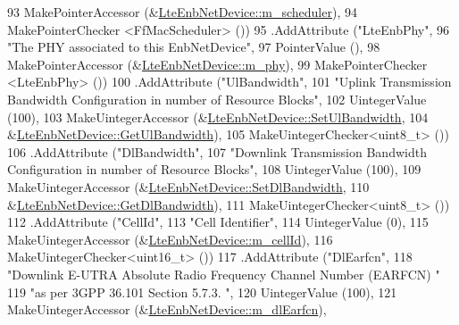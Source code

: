 \begin{DoxyCode}
93                    MakePointerAccessor (&\hyperlink{classns3_1_1LteEnbNetDevice_a5b9b286d0e44d109361ac449beec9833}{LteEnbNetDevice::m\_scheduler}),
94                    MakePointerChecker <FfMacScheduler> ())
95     .AddAttribute (\textcolor{stringliteral}{"LteEnbPhy"},
96                    \textcolor{stringliteral}{"The PHY associated to this EnbNetDevice"},
97                    PointerValue (),
98                    MakePointerAccessor (&\hyperlink{classns3_1_1LteEnbNetDevice_aefbda8e36daddbf68d0488e032ca8065}{LteEnbNetDevice::m\_phy}),
99                    MakePointerChecker <LteEnbPhy> ())
100     .AddAttribute (\textcolor{stringliteral}{"UlBandwidth"},
101                    \textcolor{stringliteral}{"Uplink Transmission Bandwidth Configuration in number of Resource Blocks"},
102                    UintegerValue (100),
103                    MakeUintegerAccessor (&\hyperlink{classns3_1_1LteEnbNetDevice_a37c83f038ac37b1208dfa89e7a91e33d}{LteEnbNetDevice::SetUlBandwidth}, 
104                                          &\hyperlink{classns3_1_1LteEnbNetDevice_acf6d570213662cdf2bfa96b3f2952798}{LteEnbNetDevice::GetUlBandwidth}),
105                    MakeUintegerChecker<uint8\_t> ())
106     .AddAttribute (\textcolor{stringliteral}{"DlBandwidth"},
107                    \textcolor{stringliteral}{"Downlink Transmission Bandwidth Configuration in number of Resource Blocks"},
108                    UintegerValue (100),
109                    MakeUintegerAccessor (&\hyperlink{classns3_1_1LteEnbNetDevice_a28cde9c5c6895b96766ca39328258683}{LteEnbNetDevice::SetDlBandwidth}, 
110                                          &\hyperlink{classns3_1_1LteEnbNetDevice_a3e52283f4b056c4a7f6f1840d4a3bb61}{LteEnbNetDevice::GetDlBandwidth}),
111                    MakeUintegerChecker<uint8\_t> ())
112     .AddAttribute (\textcolor{stringliteral}{"CellId"},
113                    \textcolor{stringliteral}{"Cell Identifier"},
114                    UintegerValue (0),
115                    MakeUintegerAccessor (&\hyperlink{classns3_1_1LteEnbNetDevice_a8e83ce1a84658cd8a99ffe3c6981e067}{LteEnbNetDevice::m\_cellId}),
116                    MakeUintegerChecker<uint16\_t> ())
117     .AddAttribute (\textcolor{stringliteral}{"DlEarfcn"},
118                    \textcolor{stringliteral}{"Downlink E-UTRA Absolute Radio Frequency Channel Number (EARFCN) "}
119                    \textcolor{stringliteral}{"as per 3GPP 36.101 Section 5.7.3. "},
120                    UintegerValue (100),
121                    MakeUintegerAccessor (&\hyperlink{classns3_1_1LteEnbNetDevice_a83a5acd3846339fc92e5b7693fa0faef}{LteEnbNetDevice::m\_dlEarfcn}),

\end{DoxyCode}
